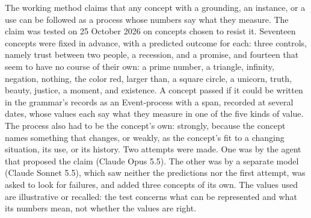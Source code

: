 \documentclass[11pt,a4paper]{article}
\begin{document}
The working method claims that any concept with a grounding, an instance, or a
use can be followed as a process whose numbers say what they measure. The claim
was tested on 25 October 2026 on concepts chosen to resist it. Seventeen
concepts were fixed in advance, with a predicted outcome for each: three
controls, namely trust between two people, a recession, and a promise, and
fourteen that seem to have no course of their own: a prime number, a triangle,
infinity, negation, nothing, the color red, larger than, a square circle, a
unicorn, truth, beauty, justice, a moment, and existence. A concept passed if
it could be written in the grammar's records as an Event-process with a span,
recorded at several dates, whose values each say what they measure in one of
the five kinds of value. The process also had to be the concept's own:
strongly, because the concept names something that changes, or weakly, as the
concept's fit to a changing situation, its use, or its history. Two attempts
were made. One was by the agent that proposed the claim (Claude Opus 5.5). The
other was by a separate model (Claude Sonnet 5.5), which saw neither the
predictions nor the first attempt, was asked to look for failures, and added
three concepts of its own. The values used are illustrative or recalled: the
test concerns what can be represented and what its numbers mean, not whether
the values are right.
\end{document}
